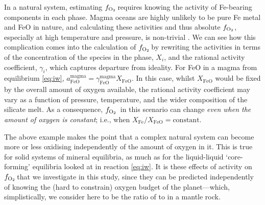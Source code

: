 \documentclass[fleqn,usenatbib,twocolumn]{mnras}
\newcommand{\fo}{$f_{\ce{O2}}$}
\newcommand{\todo}[1]{\textit{\textcolor{violet}{{#1}}}}
\begin{document}
In a natural system, estimating \fo\,requires knowing the activity of Fe-bearing components in each phase. Magma oceans are highly unlikely to be pure Fe metal and FeO in nature, and calculating these activities and thus absolute \fo, especially at high temperature and pressure, is non-trivial \citep[e.g.,][]{righter_redox_2012}. We can see how this complication comes into the calculation of \fo\,by rewriting the activities in terms of the concentration of the species in the phase, $X_i$, and the rational activity coefficient, $\gamma_i$, which captures departure from ideality. For FeO in a magma from equilibrium \eqref{eq:iw}, ${a^\text{magma}_\text{FeO} = \gamma^\text{magma}_\text{FeO}X_\text{FeO}}$. In this case, whilst $X_\text{FeO}$ would be fixed by the overall amount of oxygen available, the rational activity coefficient may vary as a function of pressure, temperature, and the wider composition of the silicate melt.  As a consequence, \fo\, in this scenario can change \emph{even when the amount of oxygen is constant}; i.e., when ${X_\textrm{Fe}/X_\textrm{FeO}=\textrm{constant}}$.  

The above example makes the point that a complex natural system can become more or less oxidising independently of the amount of oxygen in it. This is true for solid systems of mineral equilibria, as much as for the liquid-liquid `core-forming' equilibria looked at in reaction \eqref{eq:iw}. It is these effects of activity on \fo\,that we investigate in this study, since they can be predicted independently of knowing the (hard to constrain) oxygen budget of the planet---which, simplistically, we consider here to be the ratio of  to  in a mantle rock.


\end{document}
